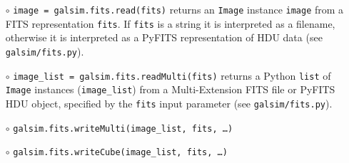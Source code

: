 \documentclass[preprint,11pt]{../../devel/modules/aastex}
\begin{document}
\begin{itemize}

\item[$\circ$] \texttt{image = galsim.fits.read(fits)} \newline
{returns an \texttt{Image} instance \texttt{image} from a FITS
  representation \texttt{fits}.  If \texttt{fits} is a string it is
  interpreted as a filename, otherwise it is interpreted as a PyFITS
  representation of HDU data (see
  \texttt{galsim/fits.py}).}
\item[$\circ$] \texttt{image\_list = galsim.fits.readMulti(fits)}
  \newline
{returns a Python \texttt{list} of \texttt{Image} instances (\texttt{image\_list}) from a
Multi-Extension FITS file or PyFITS HDU object, specified by the
\texttt{fits} input parameter (see \texttt{galsim/fits.py}).}
\item[$\circ$] \texttt{galsim.fits.writeMulti(image\_list, fits, \dots)}
\item[$\circ$] \texttt{galsim.fits.writeCube(image\_list, fits, \dots)}

\end{itemize}
\end{document}
